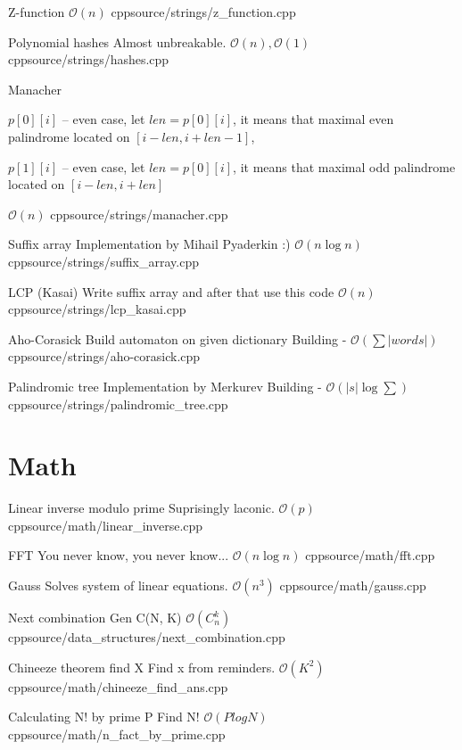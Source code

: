 \documentclass[landscape, 10pt, a4paper, oneside, twocolumn]{extarticle}
\begin{document}
\Algorithm
{Z-function}
{}
{$\mathcal{O}(n)$}
{cpp}{source/strings/z_function.cpp}

\Algorithm
{Polynomial hashes}
{Almost unbreakable.}
{$\mathcal{O}(n), \mathcal{O}(1)$}
{cpp}{source/strings/hashes.cpp}

\Algorithm
{Manacher}
{$p[0][i]$ – even case, let $len = p[0][i]$,
it means that maximal even palindrome located on $[i - len, i + len - 1]$,

$p[1][i]$ – even case, let $len = p[0][i]$,
it means that maximal odd palindrome located on $[i - len, i + len]$
}
{$\mathcal{O}(n)$}
{cpp}{source/strings/manacher.cpp}

\Algorithm
{Suffix array}
{Implementation by Mihail Pyaderkin :)}
{$\mathcal{O}(n \log n)$}
{cpp}{source/strings/suffix_array.cpp}

\Algorithm
{LCP (Kasai)}
{Write suffix array and after that use this code}
{$\mathcal{O}(n)$}
{cpp}{source/strings/lcp_kasai.cpp}

\Algorithm
{Aho-Corasick}
{Build automaton on given dictionary}
{Building - $\mathcal{O}(\sum|words|)$}
{cpp}{source/strings/aho-corasick.cpp}


\Algorithm
{Palindromic tree}
{Implementation by Merkurev}
{Building - $\mathcal{O}(|s| \log \sum)$}
{cpp}{source/strings/palindromic_tree.cpp}





\section{Math}

\Algorithm
{Linear inverse modulo prime}
{Suprisingly laconic.}
{$\mathcal{O}(p)$}
{cpp}{source/math/linear_inverse.cpp}

\Algorithm
{FFT}
{You never know, you never know...}
{$\mathcal{O}(n \log n)$}
{cpp}{source/math/fft.cpp}

\Algorithm
{Gauss}
{Solves system of linear equations.}
{$\mathcal{O}(n^{3})$}
{cpp}{source/math/gauss.cpp}

\Algorithm
{Next combination}
{Gen C(N, K)}
{$\mathcal{O}(C_{n}^{k})$}
{cpp}{source/data_structures/next_combination.cpp}

\Algorithm
{Chineeze theorem find X}
{Find x from reminders.}
{$\mathcal{O}(K^{2})$}
{cpp}{source/math/chineeze_find_ans.cpp}

\Algorithm
{Calculating N! by prime P}
{Find N!}
{$\mathcal{O}(P log N)$}
{cpp}{source/math/n_fact_by_prime.cpp}
\end{document}
